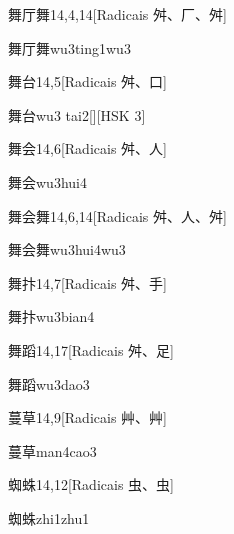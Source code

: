\begin{entry}{舞厅舞}{14,4,14}[Radicais ⾇、⼚、⾇]
  \begin{phonetics}{舞厅舞}{wu3ting1wu3}
  \end{phonetics}
\end{entry}

\begin{entry}{舞台}{14,5}[Radicais ⾇、⼝]
  \begin{phonetics}{舞台}{wu3 tai2}[][HSK 3]
  \end{phonetics}
\end{entry}

\begin{entry}{舞会}{14,6}[Radicais ⾇、⼈]
  \begin{phonetics}{舞会}{wu3hui4}
  \end{phonetics}
\end{entry}

\begin{entry}{舞会舞}{14,6,14}[Radicais ⾇、⼈、⾇]
  \begin{phonetics}{舞会舞}{wu3hui4wu3}
  \end{phonetics}
\end{entry}

\begin{entry}{舞抃}{14,7}[Radicais ⾇、⼿]
  \begin{phonetics}{舞抃}{wu3bian4}
  \end{phonetics}
\end{entry}

\begin{entry}{舞蹈}{14,17}[Radicais ⾇、⾜]
  \begin{phonetics}{舞蹈}{wu3dao3}
  \end{phonetics}
\end{entry}

\begin{entry}{蔓草}{14,9}[Radicais ⾋、⾋]
  \begin{phonetics}{蔓草}{man4cao3}
  \end{phonetics}
\end{entry}

\begin{entry}{蜘蛛}{14,12}[Radicais ⾍、⾍]
  \begin{phonetics}{蜘蛛}{zhi1zhu1}
  \end{phonetics}
\end{entry}

